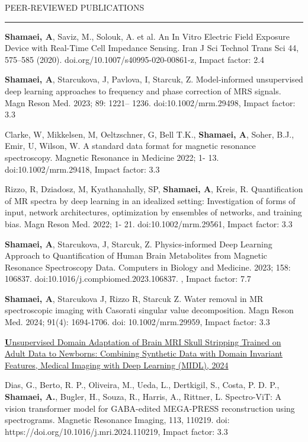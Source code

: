 \documentclass{resume} %
\renewenvironment{rSection}[1]{
\sectionskip
\textcolor{RoyalPurple}{\MakeUppercase{#1}}
\sectionlineskip
\hrule
\begin{list}{}{
\setlength{\leftmargin}{1.5em}
}
\item[]
}{
\end{list}
}
\begin{document}
\begin{rSection}{ Peer-Reviewed Publications }{}
\begin{rSubsection}{}{}{}{}

\item \textbf{Shamaei, A}, Saviz, M., Solouk, A. et al. An In Vitro Electric Field Exposure Device with Real-Time Cell Impedance Sensing. Iran J Sci Technol Trans Sci 44, 575–585 (2020). doi.org/10.1007/s40995-020-00861-z, Impact factor: 2.4
\item \textbf{Shamaei, A}, Starcukova, J, Pavlova, I, Starcuk, Z. Model-informed unsupervised deep learning approaches to frequency and phase correction of MRS signals. Magn Reson Med. 2023; 89: 1221– 1236. doi:10.1002/mrm.29498,  Impact factor: 3.3

\item Clarke, W, Mikkelsen, M, Oeltzschner, G, Bell T.K.,\textbf{ Shamaei, A}, Soher, B.J., Emir, U, Wilson, W. A standard data format for magnetic resonance spectroscopy. Magnetic Resonance in Medicine 2022; 1- 13. doi:10.1002/mrm.29418, Impact factor: 3.3

\item Rizzo, R, Dziadosz, M, Kyathanahally, SP, \textbf{Shamaei, A}, Kreis, R. Quantification of MR spectra by deep learning in an idealized setting: Investigation of forms of input, network architectures, optimization by ensembles of networks, and training bias. Magn Reson Med. 2022; 1- 21. doi:10.1002/mrm.29561, Impact factor: 3.3

\item \textbf{Shamaei, A}, Starcukova, J, Starcuk, Z. Physics-informed Deep Learning Approach to Quantification of Human Brain Metabolites from Magnetic Resonance Spectroscopy Data. Computers in Biology and Medicine. 2023; 158: 106837. doi:10.1016/j.compbiomed.2023.106837.  , Impact factor: 7.7

\item \textbf{Shamaei, A}, Starcukova J, Rizzo R, Starcuk Z. Water removal in MR spectroscopic imaging with Casorati singular value decomposition. Magn Reson Med. 2024; 91(4): 1694-1706. doi: 10.1002/mrm.29959, Impact factor: 3.3

\item \href{https://openreview.net/forum?id=vu4LsiSpf7&referrer=%5Bthe%20profile%20of%20Abbas%20Omidi%5D(%2Fprofile%3Fid%3D~Abbas_Omidi1)} {\textbf Unsupervised Domain Adaptation of Brain MRI Skull Stripping Trained on Adult Data to Newborns: Combining Synthetic Data with Domain Invariant Features, Medical Imaging with Deep Learning (MIDL), 2024}

\item Dias, G., Berto, R. P., Oliveira, M., Ueda, L., Dertkigil, S., Costa, P. D. P., \textbf{Shamaei, A.}, Bugler, H., Souza, R., Harris, A., Rittner, L. Spectro-ViT: A vision transformer model for GABA-edited MEGA-PRESS reconstruction using spectrograms. Magnetic Resonance Imaging, 113, 110219. doi: https://doi.org/10.1016/j.mri.2024.110219, Impact factor: 3.3
\end{rSubsection}
\end{rSection}
\end{document}
